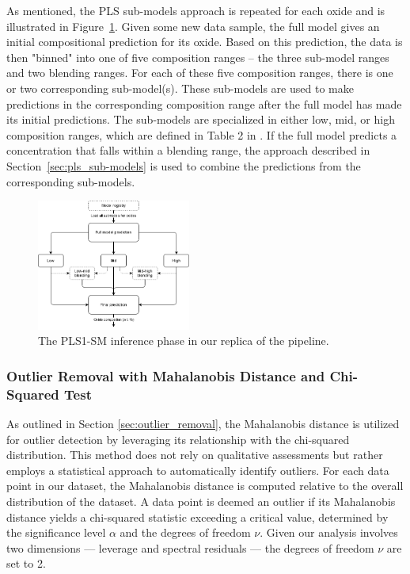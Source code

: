 As mentioned, the PLS sub-models approach is repeated for each oxide and is illustrated in Figure~\ref{fig:pls_inference}.
Given some new data sample, the full model gives an initial compositional prediction for its oxide.
Based on this prediction, the data is then "binned" into one of five composition ranges -- the three sub-model ranges and two blending ranges.
For each of these five composition ranges, there is one or two corresponding sub-model(s).
These sub-models are used to make predictions in the corresponding composition range after the full model has made its initial predictions.
The sub-models are specialized in either low, mid, or high composition ranges, which are defined in Table 2 in \citet{andersonImprovedAccuracyQuantitative2017}.
If the full model predicts a concentration that falls within a blending range, the approach described in Section~\ref{sec:pls_sub-models} is used to combine the predictions from the corresponding sub-models.

\begin{figure}
	\centering
	\includegraphics[width=0.45\textwidth]{images/pls_inference.png}
	\caption{The PLS1-SM inference phase in our replica of the pipeline.}
	\label{fig:pls_inference}
\end{figure}

\subsubsection{Outlier Removal with Mahalanobis Distance and Chi-Squared Test}\label{sec:methodology_outlier_removal}
As outlined in Section \ref{sec:outlier_removal}, the Mahalanobis distance is utilized for outlier detection by leveraging its relationship with the chi-squared distribution.
This method does not rely on qualitative assessments but rather employs a statistical approach to automatically identify outliers.
For each data point in our dataset, the Mahalanobis distance is computed relative to the overall distribution of the dataset.
A data point is deemed an outlier if its Mahalanobis distance yields a chi-squared statistic exceeding a critical value, determined by the significance level $\alpha$ and the degrees of freedom $\nu$.
Given our analysis involves two dimensions --- leverage and spectral residuals --- the degrees of freedom $\nu$ are set to 2.

